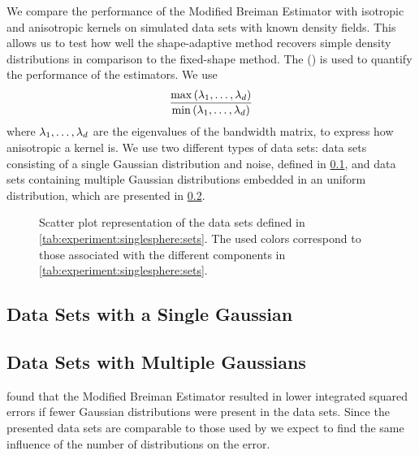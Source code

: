 We compare the performance of the Modified Breiman Estimator with isotropic and anisotropic kernels on simulated data sets with known density fields. This allows us to test how well the shape-adaptive method recovers simple density distributions in comparison to the fixed-shape method. 
The \mse (\MSE) is used to quantify the performance of the estimators. We use
\begin{equation*}\label{eq:experiment:anisotropicmetric}
	\frac{\max\left(\lambda_1, \dotsc, \lambda_d \right)}{\min\left(\lambda_1, \dotsc, \lambda_d \right)}
\end{equation*}
where $\lambda_1, \dotsc, \lambda_d$ are the eigenvalues of the bandwidth matrix, to express how anisotropic a kernel is.
We use two different types of data sets: data sets consisting of a single Gaussian distribution and noise, defined in \cref{s:experiment:singlesphere},  and data sets containing multiple Gaussian distributions embedded in an uniform distribution, which are presented in \cref{s:experiment:multisphere}.

\begin{figure*}
	\centering
	
	\caption{Scatter plot representation of the data sets defined in \cref{tab:experiment:singlesphere:sets}. The used colors correspond to those associated with the different components in \cref{tab:experiment:singlesphere:sets}.}
	\label{fig:experiment:singlesphere:sets}
\end{figure*}

\subsection{Data Sets with a Single Gaussian}
\label{s:experiment:singlesphere}


\subsection{Data Sets with Multiple Gaussians}
\label{s:experiment:multisphere}


\textcite{ferdosi2011comparison} found that the Modified Breiman Estimator resulted in lower integrated squared errors if fewer Gaussian distributions were present in the data sets. Since the presented data sets are comparable to those used by \citeauthor{ferdosi2011comparison} we expect to find the same influence of the number of distributions on the error.
